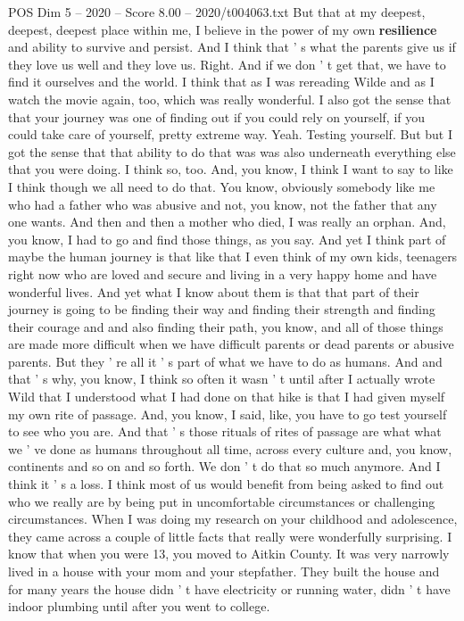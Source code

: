\begin{textsample}{POS Dim 5 – 2020 – Score 8.00 – 2020/t004063.txt}
But that at my deepest, deepest, deepest place within me, I believe in the power of my own \textbf{resilience} and ability to survive and persist.
And I think that ' s what the parents give us if they love us well and they love us.
Right.
And if we don ' t get that, we have to find it ourselves and the world.
I think that as I was rereading Wilde and as I watch the movie again, too, which was really wonderful.
I also got the sense that that your journey was one of finding out if you could rely on yourself, if you could take care of yourself, pretty extreme way.
Yeah.
Testing yourself.
But but I got the sense that that ability to do that was was also underneath everything else that you were doing.
I think so, too.
And, you know, I think I want to say to like I think though we all need to do that.
You know, obviously somebody like me who had a father who was abusive and not, you know, not the father that any one wants.
And then and then a mother who died, I was really an orphan.
And, you know, I had to go and find those things, as you say.
And yet I think part of maybe the human journey is that like that I even think of my own kids, teenagers right now who are loved and secure and living in a very happy home and have wonderful lives.
And yet what I know about them is that that part of their journey is going to be finding their way and finding their strength and finding their courage and and also finding their path, you know, and all of those things are made more difficult when we have difficult parents or dead parents or abusive parents.
But they ' re all it ' s part of what we have to do as humans.
And and that ' s why, you know, I think so often it wasn ' t until after I actually wrote Wild that I understood what I had done on that hike is that I had given myself my own rite of passage.
And, you know, I said, like, you have to go test yourself to see who you are.
And that ' s those rituals of rites of passage are what what we ' ve done as humans throughout all time, across every culture and, you know, continents and so on and so forth.
We don ' t do that so much anymore.
And I think it ' s a loss.
I think most of us would benefit from being asked to find out who we really are by being put in uncomfortable circumstances or challenging circumstances.
When I was doing my research on your childhood and adolescence, they came across a couple of little facts that really were wonderfully surprising.
I know that when you were 13, you moved to Aitkin County.
It was very narrowly lived in a house with your mom and your stepfather.
They built the house and for many years the house didn ' t have electricity or running water, didn ' t have indoor plumbing until after you went to college.

\end{textsample}
